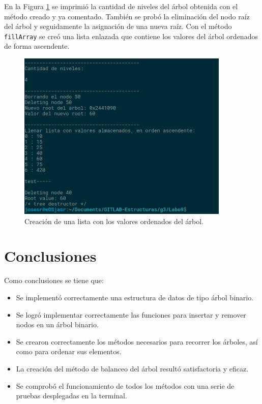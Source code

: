 En la Figura \ref{fig:4} se imprimió la cantidad de niveles del árbol obtenida con el método creado y ya comentado. También se probó la eliminación del nodo raíz del árbol y seguidamente la asignación de una nueva raíz. Con el método \texttt{fillArray} se creó una lista enlazada que contiene los valores del árbol ordenados de forma ascendente.

\begin{figure}[H]
\centering
\includegraphics[width=0.9\textwidth]{imgs/Labo9/L9-4.png}
\caption{Creación de una lista con los valores ordenados del árbol.}
\label{fig:4}
\end{figure}


\section{Conclusiones}


Como conclusiones se tiene que:

\begin{itemize}
\item Se implementó correctamente una estructura de datos de tipo árbol binario.
\item Se logró  implementar correctamente las funciones para insertar y remover nodos en un árbol binario.
\item Se crearon correctamente los métodos necesarios para recorrer los árboles, así como para ordenar sus elementos.
\item La creación del método de balanceo del árbol resultó satisfactoria y eficaz.
\item Se comprobó el funcionamiento de todos los métodos con una serie de pruebas desplegadas en la terminal.
\end{itemize}


